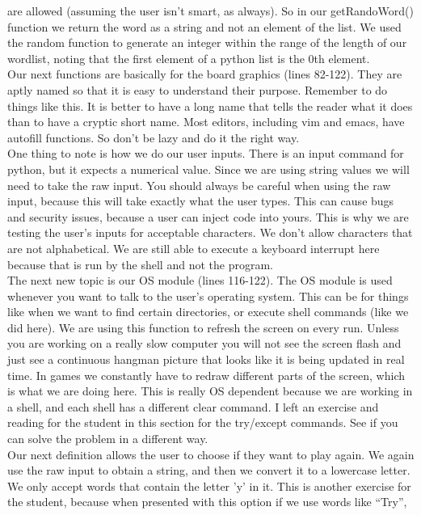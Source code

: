 \documentclass[11pt]{article}   %
\begin{document}
are allowed (assuming the user isn't smart, as always).  So in our getRandoWord() function we return the word as
a string and not an element of the list.  We used the random function to generate an integer within the range of 
the length of our wordlist, noting that the first element of a python list is the 0th element.
\\
Our next functions are basically for the board graphics (lines 82-122).  They are aptly named so that it is easy to understand
their purpose.  Remember to do things like this.  It is better to have a long name that tells the reader what it 
does than to have a cryptic short name.  Most editors, including vim and emacs, have autofill functions.  So don't
be lazy and do it the right way.  
\\
One thing to note is how we do our user inputs.  There is an input command for python, but it expects a numerical
value.  Since we are using string values we will need to take the raw input.  You should always be careful when 
using the raw input, because this will take exactly what the user types.  This can cause bugs and security issues,
because a user can inject code into yours.  This is why we are testing the user's inputs for acceptable characters.
We don't allow characters that are not alphabetical.  We are still able to execute a keyboard interrupt here because
that is run by the shell and not the program.  
\\
The next new topic is our OS module (lines 116-122).  The OS module is used whenever you want to talk to the user's operating system.
This can be for things like when we want to find certain directories, or execute shell commands (like we did here).
We are using this function to refresh the screen on every run.  Unless you are working on a really slow computer
you will not see the screen flash and just see a continuous hangman picture that looks like it is being updated
in real time.  In games we constantly have to redraw different parts of the screen, which is what we are doing here.
This is really OS dependent because we are working in a shell, and each shell has a different clear command.  I
left an exercise and reading for the student in this section for the try/except commands.  See if you can solve
the problem in a different way.
\\
Our next definition allows the user to choose if they want to play again.  We again use the raw input to obtain
a string, and then we convert it to a lowercase letter.  We only accept words that contain the letter 'y' in it.
This is another exercise for the student, because when presented with this option if we use words like ``Try'',
\end{document}
